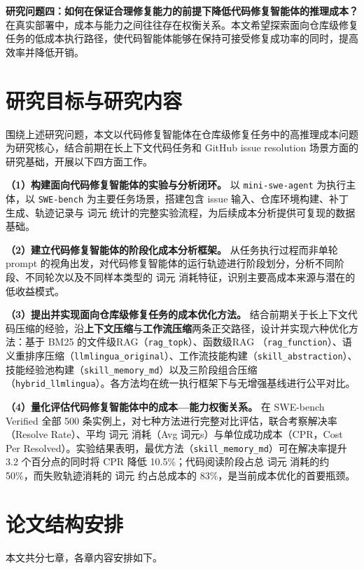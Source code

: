 \textbf{研究问题四：如何在保证合理修复能力的前提下降低代码修复智能体的推理成本？} 在真实部署中，成本与能力之间往往存在权衡关系。本文希望探索面向仓库级修复任务的低成本执行路径，使代码智能体能够在保持可接受修复成功率的同时，提高效率并降低开销。


\section{研究目标与研究内容}

围绕上述研究问题，本文以代码修复智能体在仓库级修复任务中的高推理成本问题为研究核心，结合前期在长上下文代码任务和 GitHub issue resolution 场景方面的研究基础，开展以下四方面工作。

\textbf{（1）构建面向代码修复智能体的实验与分析闭环。} 以 \texttt{mini-swe-agent} 为执行主体，以 \texttt{SWE-bench} 为主要任务场景，搭建包含 issue 输入、仓库环境构建、补丁生成、轨迹记录与 词元 统计的完整实验流程，为后续成本分析提供可复现的数据基础。

\textbf{（2）建立代码修复智能体的阶段化成本分析框架。} 从任务执行过程而非单轮 prompt 的视角出发，对代码修复智能体的运行轨迹进行阶段划分，分析不同阶段、不同轮次以及不同样本类型的 词元 消耗特征，识别主要高成本来源与潜在的低收益模式。

\textbf{（3）提出并实现面向仓库级修复任务的成本优化方法。} 结合前期关于长上下文代码压缩的经验，沿\textbf{上下文压缩}与\textbf{工作流压缩}两条正交路径，设计并实现六种优化方法：基于 BM25 的文件级RAG（\texttt{rag\_topk}）、函数级RAG （\texttt{rag\_function}）、语义重排序压缩（\texttt{llmlingua\_original}）、工作流技能构建（\texttt{skill\_abstraction}）、技能经验池构建（\texttt{skill\_memory\_md}）以及三阶段组合压缩（\texttt{hybrid\_llmlingua}）。各方法均在统一执行框架下与无增强基线进行公平对比。

\textbf{（4）量化评估代码修复智能体中的成本—能力权衡关系。} 在 SWE-bench Verified 全部 500 条实例上，对七种方法进行完整对比评估，联合考察解决率（Resolve Rate）、平均 词元 消耗（Avg 词元s）与单位成功成本（CPR，Cost Per Resolved）。实验结果表明，最优方法（\texttt{skill\_memory\_md}）可在解决率提升 3.2 个百分点的同时将 CPR 降低 10.5\%；代码阅读阶段占总 词元 消耗的约 50\%，而失败轨迹消耗的 词元 约占总成本的 83\%，是当前成本优化的首要瓶颈。


\section{论文结构安排}

本文共分七章，各章内容安排如下。

